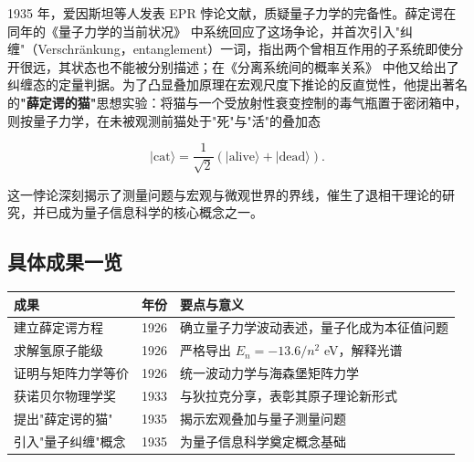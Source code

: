 \documentclass{ctexart} %
\begin{document}
1935 年，爱因斯坦等人发表 EPR 悖论文献\cite{einstein1935epr}，质疑量子力学的完备性。薛定谔在同年的《量子力学的当前状况》\cite{schrodinger1935cat} 中系统回应了这场争论，并首次引入"纠缠"（Verschr{\"a}nkung，entanglement）一词，指出两个曾相互作用的子系统即使分开很远，其状态也不能被分别描述；在《分离系统间的概率关系》\cite{schrodinger1935ent} 中他又给出了纠缠态的定量判据。为了凸显叠加原理在宏观尺度下推论的反直觉性，他提出著名的\textbf{"薛定谔的猫"}思想实验：将猫与一个受放射性衰变控制的毒气瓶置于密闭箱中，则按量子力学，在未被观测前猫处于"死"与"活"的叠加态

\begin{equation}
    |\mathrm{cat}\rangle = \frac{1}{\sqrt{2}}\left(|\mathrm{alive}\rangle + |\mathrm{dead}\rangle\right).
    \label{eq:cat}
\end{equation}

这一悖论深刻揭示了测量问题与宏观与微观世界的界线，催生了退相干理论的研究，并已成为量子信息科学的核心概念之一。

\subsection*{具体成果一览}
\begin{center}
\begin{tabular}{@{}p{3.6cm}p{1.6cm}p{5.6cm}@{}}
\hline
\textbf{成果} & \textbf{年份} & \textbf{要点与意义} \\
\hline
建立薛定谔方程 & 1926 & 确立量子力学波动表述，量子化成为本征值问题 \\
求解氢原子能级 & 1926 & 严格导出 $E_n = -13.6/n^2$ eV，解释光谱 \\
证明与矩阵力学等价 & 1926 & 统一波动力学与海森堡矩阵力学 \\
获诺贝尔物理学奖 & 1933 & 与狄拉克分享，表彰其原子理论新形式 \\
提出"薛定谔的猫" & 1935 & 揭示宏观叠加与量子测量问题 \\
引入"量子纠缠"概念 & 1935 & 为量子信息科学奠定概念基础 \\
\hline
\end{tabular}
\end{center}

\clearpage


\end{document}
